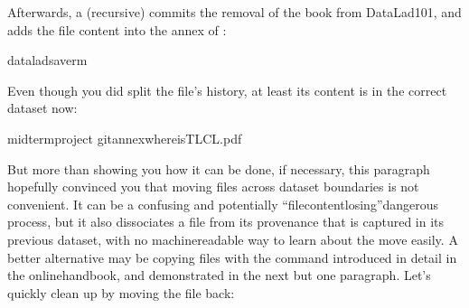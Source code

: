 \sphinxAtStartPar
Afterwards, a (recursive)  commits the removal of the book from
DataLad\sphinxhyphen{}101, and adds the file content into the annex of :

\begin{sphinxVerbatim}[commandchars=\\\{\}]
dataladsave\PYGZhy{}r\PYGZhy{}m
\end{sphinxVerbatim}

\sphinxAtStartPar
Even though you did split the file’s history, at least its content is in the
correct dataset now:

\begin{sphinxVerbatim}[commandchars=\\\{\}]
midterm\PYGZus{}project
gitannexwhereisTLCL.pdf
\end{sphinxVerbatim}

\newpage

\sphinxAtStartPar
But more than showing you how it can be done, if necessary, this paragraph
hopefully convinced you that moving files across dataset boundaries is not
convenient. It can be a confusing and potentially “file\sphinxhyphen{}content\sphinxhyphen{}losing”\sphinxhyphen{}dangerous
process, but it also dissociates a file from its provenance that is captured
in its previous dataset, with no machine\sphinxhyphen{}readable way to learn about the move
easily. A better alternative may be copying files with the 
command introduced in detail in the online\sphinxhyphen{}handbook, and demonstrated in the next
but one paragraph. Let’s quickly clean up by moving the file back:

